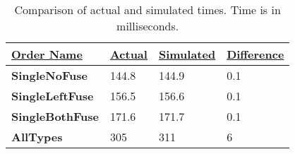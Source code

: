 \begin{table}[htb]
\centering
\begin{tabular}{|l|l|l|l|}
\hline
{\ul \textbf{Order Name}} & {\ul \textbf{Actual}} & {\ul \textbf{Simulated}} & {\ul \textbf{Difference}} \\ \hline
\textbf{SingleNoFuse}     & 144.8                 & 144.9                    & 0.1                       \\ \hline
\textbf{SingleLeftFuse}   & 156.5                 & 156.6                    & 0.1                       \\ \hline
\textbf{SingleBothFuse}   & 171.6                 & 171.7                    & 0.1                       \\ \hline
\textbf{AllTypes}         & 305                   & 311                      & 6                         \\ \hline
\end{tabular}
    \caption{Comparison of actual and simulated times. Time is in milliseconds.}
    \label{tab:cp-results}
\end{table}